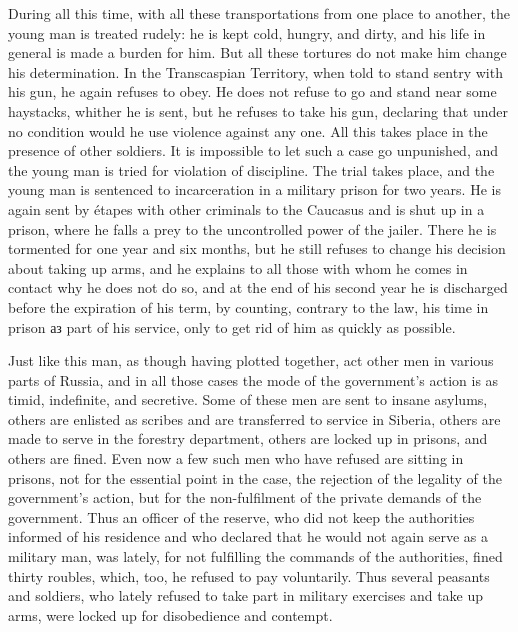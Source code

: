 \documentclass{book}
\begin{document}
During all this time, with all these transportations from one place to another, the young man is treated rudely: he is kept cold, hungry, and dirty, and his life in general is made a burden for him. But all these tortures do not make him change his determination. In the Transcaspian Territory, when told to stand sentry with his gun, he again refuses to obey. He does not refuse to go and stand near some haystacks, whither he is sent, but he refuses to take his gun, declaring that under no condition would he use violence against any one. All this takes place in the presence of other soldiers. It is impossible to let such a case go unpunished, and the young man is tried for violation of discipline. The trial takes place, and the young man is sentenced to incarceration in a military prison for two years. He is again sent by étapes with other criminals to the Caucasus and is shut up in a prison, where he falls a prey to the uncontrolled power of the jailer. There he is tormented for one year and six months, but he still refuses to change his decision about taking up arms, and he explains to all those with whom he comes in contact why he does not do so, and at the end of his second year he is discharged before the expiration of his term, by counting, contrary to the law, his time in prison аз part of his service, only to get rid of him as quickly as possible.

Just like this man, as though having plotted together, act other men in various parts of Russia, and in all those cases the mode of the government’s action is as timid, indefinite, and secretive. Some of these men are sent to insane asylums, others are enlisted as scribes and are transferred to service in Siberia, others are made to serve in the forestry department, others are locked up in prisons, and others are fined. Even now a few such men who have refused are sitting in prisons, not for the essential point in the case, the rejection of the legality of the government’s action, but for the non-fulfilment of the private demands of the government. Thus an officer of the reserve, who did not keep the authorities informed of his residence and who declared that he would not again serve as a military man, was lately, for not fulfilling the commands of the authorities, fined thirty roubles, which, too, he refused to pay voluntarily. Thus several peasants and soldiers, who lately refused to take part in military exercises and take up arms, were locked up for disobedience and contempt.
\end{document}
